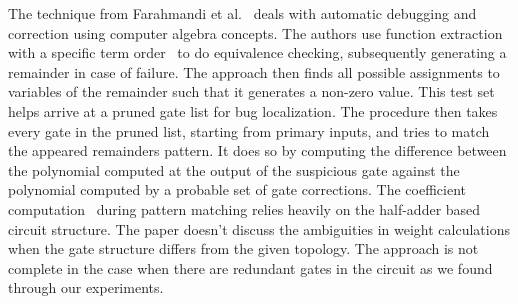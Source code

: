 The technique from Farahmandi et al.~\cite{farimah:2016} deals with
automatic debugging and correction using computer algebra
concepts. The authors use function extraction~\cite{maciej:2015:1}
with a specific term order~\cite{lv} to do equivalence checking,
subsequently generating a remainder in case of failure. The approach
then finds all possible assignments to variables of the remainder such
that it generates a non-zero value. This test set helps arrive at a
pruned gate list for bug localization. The procedure then takes every
gate in the pruned list, starting from primary inputs, and tries to
match the appeared remainders pattern. It does so by computing the
difference between the polynomial computed at the output of the
suspicious gate against the polynomial computed by a probable set of
gate corrections. The coefficient computation~\cite{maciej:2015:2}
during pattern matching relies heavily on the half-adder based circuit
structure. The paper doesn't discuss the ambiguities in weight
calculations when the gate structure differs from the given
topology. The approach is not complete in the case when there are
redundant gates in the circuit as we found through our
experiments.




